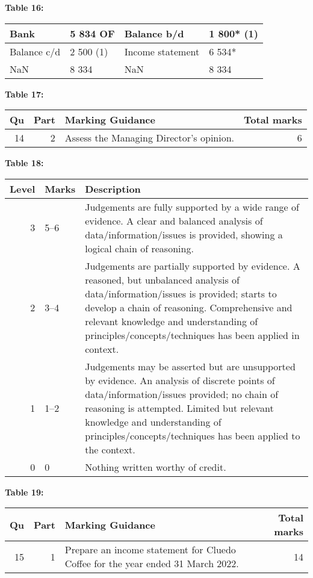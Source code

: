 \documentclass{article}
\begin{document}
\textbf{Table 16:}
\begin{tabular}{llll}
\toprule
Bank & 5 834 OF & Balance b/d & 1 800* (1) \\
\midrule
Balance c/d & 2 500 (1) & Income statement & 6 534* \\
NaN & 8 334 & NaN & 8 334 \\
\bottomrule
\end{tabular}

\textbf{Table 17:}
\begin{tabular}{rrlr}
\toprule
Qu & Part & Marking Guidance & Total
marks \\
\midrule
14 & 2 & Assess the Managing Director’s opinion. & 6 \\
\bottomrule
\end{tabular}

\textbf{Table 18:}
\begin{tabular}{rll}
\toprule
Level & Marks & Description \\
\midrule
3 & 5–6 & Judgements are fully supported by a wide range of evidence.  A clear and balanced
analysis of data/information/issues is provided, showing a logical chain of reasoning. \\
2 & 3–4 & Judgements are partially supported by evidence.  A reasoned, but unbalanced
analysis of data/information/issues is provided; starts to develop a chain of
reasoning.  Comprehensive and relevant knowledge and understanding of
principles/concepts/techniques has been applied in context. \\
1 & 1–2 & Judgements may be asserted but are unsupported by evidence.  An analysis of
discrete points of data/information/issues provided; no chain of reasoning is
attempted.  Limited but relevant knowledge and understanding of
principles/concepts/techniques has been applied to the context. \\
0 & 0 & Nothing written worthy of credit. \\
\bottomrule
\end{tabular}

\textbf{Table 19:}
\begin{tabular}{rrlr}
\toprule
Qu & Part & Marking Guidance & Total
marks \\
\midrule
15 & 1 & Prepare an income statement for Cluedo Coffee for the year ended 31 March
2022. & 14 \\
\bottomrule
\end{tabular}
\end{document}
